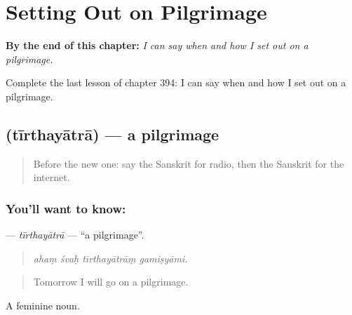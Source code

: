 
\chapter{Setting Out on Pilgrimage}
\label{ch:sa-setting-out-on-pilgrimage}

\begin{chapteropening}
\textbf{By the end of this chapter:} \emph{I can say when and how I set out on a pilgrimage.}

Complete the last lesson of chapter 394: I can say when and how I set out on a pilgrimage.
\end{chapteropening}

\section[\texorpdfstring{\sk{तीर्थयात्रा} (tīrthayātrā)}{तीर्थयात्रा (tīrthayātrā)}]{ (tīrthayātrā) — a pilgrimage}

\label{lesson:SA-C394-tirthayatra}



\begin{quote}
Before the new one: say the Sanskrit for radio, then the Sanskrit for the internet.
\end{quote}

\subsection*{You'll want to know: }
\textbf{} — \emph{tīrthayātrā} — \textquotedblleft{}a pilgrimage\textquotedblright{}.

\begin{quote}
   
\end{quote}

\begin{quote}
\emph{ahaṃ śvaḥ tīrthayātrāṃ gamiṣyāmi.}
\end{quote}

\begin{quote}
Tomorrow I will go on a pilgrimage.
\end{quote}

A feminine noun.

